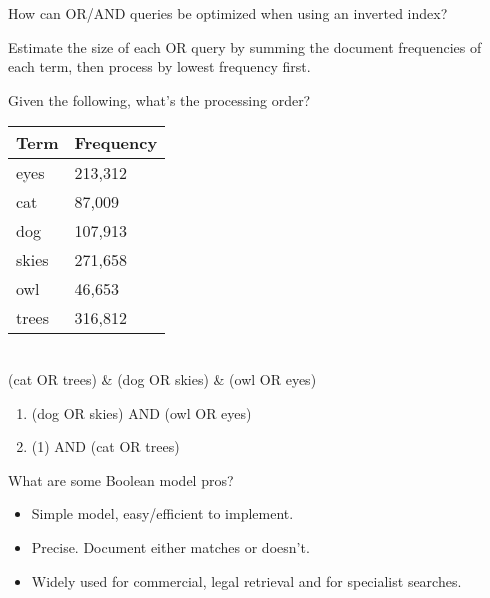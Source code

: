 \documentclass[2by4,grid]{flashcards}
\begin{document}
\begin{flashcard}{How can OR/AND queries be optimized when using an inverted index?}
	\begin{center}
        Estimate the size of each OR query by summing the document frequencies of each term, then process by lowest frequency first.
	\end{center}
\end{flashcard}

\begin{flashcard}{Given the following, what's the processing order?\\ \vspace{.4cm}
    \begin{tabular}{ll}
        \hline
        Term & Frequency \\
        \hline
        eyes & 213,312 \\
        cat & 87,009 \\
        dog & 107,913 \\
        skies & 271,658 \\
        owl & 46,653 \\
        trees & 316,812 \\
        \hline
    \end{tabular} \\ \vspace{.2cm}
    (cat OR trees) \& (dog OR skies) \& (owl OR eyes)
    }
	\begin{center}
        \begin{enumerate}
            \item (dog OR skies) AND (owl OR eyes)
            \item (1) AND (cat OR trees)
        \end{enumerate}
	\end{center}
\end{flashcard}

\begin{flashcard}{What are some Boolean model pros?}
	\begin{center}
        \begin{itemize}
            \item Simple model, easy/efficient to implement.
            \item Precise. Document either matches or doesn't.
            \item Widely used for commercial, legal retrieval and for specialist searches.
        \end{itemize}
	\end{center}
\end{flashcard}
\end{document}
